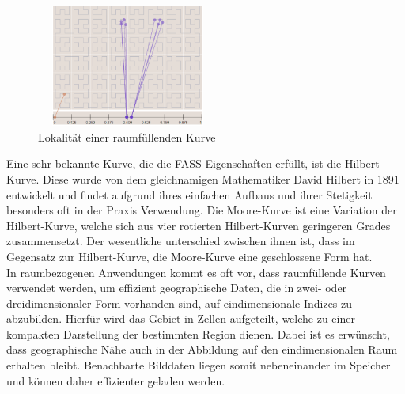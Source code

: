 \documentclass[course=erap]{aspdoc}
\begin{document}
\begin{figure}[h]
\centering
      \includegraphics[width=6cm, height=4cm]{Locality}
    \caption{Lokalität einer raumfüllenden Kurve \cite{pic:locality}}
    \label{fig:locality}
\end{figure}

Eine sehr bekannte Kurve, die die FASS-Eigenschaften erfüllt, ist die Hilbert-Kurve. Diese wurde von dem gleichnamigen Mathematiker David Hilbert in 1891 entwickelt und findet aufgrund ihres einfachen Aufbaus und ihrer Stetigkeit besonders oft in der Praxis Verwendung.
\newline
Die Moore-Kurve ist eine Variation der Hilbert-Kurve, welche sich aus vier rotierten Hilbert-Kurven geringeren Grades zusammensetzt. 
Der wesentliche unterschied zwischen ihnen ist, dass im Gegensatz zur Hilbert-Kurve, die Moore-Kurve eine geschlossene Form hat.
\\
In raumbezogenen Anwendungen kommt es oft vor, dass raumfüllende Kurven verwendet werden, um effizient geographische Daten, die in zwei- oder dreidimensionaler Form vorhanden sind, auf eindimensionale Indizes zu abzubilden. Hierfür wird das Gebiet in Zellen aufgeteilt, welche zu einer kompakten Darstellung der bestimmten Region dienen. Dabei ist es erwünscht, dass geographische Nähe auch in der Abbildung auf den eindimensionalen Raum erhalten bleibt. Benachbarte Bilddaten liegen somit nebeneinander im Speicher und können daher effizienter geladen werden.
\end{document}
